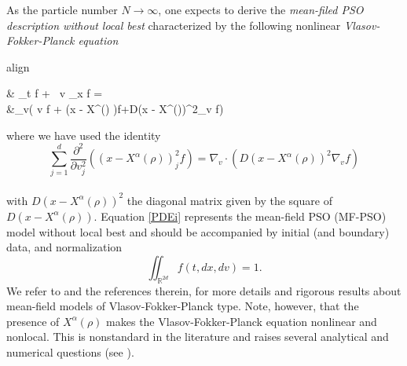 \documentclass{ims9x6}
\newcommand{\coloredeq}[2]{\begin{empheq}[box={\mymath[colback=gray!13, sharp corners]}]{align}\label{#1}#2\end{empheq}}
\newcommand{\RR}{\mathbb{R}}
\begin{document}
As the particle number $N\to \infty$, one expects to derive the  \emph{mean-filed PSO description without local best} characterized by the following nonlinear \emph{Vlasov-Fokker-Planck equation}
\coloredeq{PDEi}{
\begin{split}
& \partial_t f + \  v \cdot \nabla_x f = \\ 
&\quad \nabla_v\cdot\left(\frac{\gamma}{\iw } v f + \frac{\lambda}{\iw } (x - X^{\alpha}(\rho) )f+\frac{\sigma^2}{2\iw ^2}D(x - X^{\alpha}(\rho))^2\nabla_v f\right)
\end{split}} 
where we have used the identity
\vspace{2pt}
\begin{equation}
\sum_{j=1}^d \frac{\partial^2}{\partial v^2_j}\left((x-X^{\alpha}(\rho))^2_j f\right) = \nabla_{v}\cdot \left(D(x - X^{\alpha}(\rho))^2\nabla_{v} f\right)
\label{eq:newid}
\end{equation}
\\
with $D(x - X^{\alpha}(\rho) )^2$ the diagonal matrix given by the square of $D(x - X^{\alpha}(\rho) )$. 
Equation \eqref{PDEi} represents the mean-field PSO (MF-PSO) model without local best and 
should be accompanied by initial (and boundary)
data, and normalization
\[
\iint_{\RR^{2d}} f(t,dx,dv) = 1.
\]
We refer to \cite{CFT,BCC,Jab,Golse,Snitzman} and the references therein, for more details and rigorous results about mean-field models of Vlasov-Fokker-Planck type. Note, however, that the presence of $X^{\alpha}(\rho)$ makes the Vlasov-Fokker-Planck equation nonlinear and nonlocal. This is nonstandard in the literature and raises several analytical and numerical questions (see \cite{carrillo2018analytical,fhps20-2}).
\end{document}
